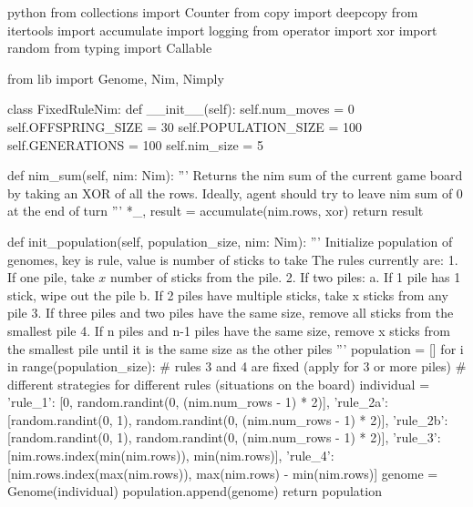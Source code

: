 \begin{mintedbox}{python}
    from collections import Counter
    from copy import deepcopy
    from itertools import accumulate
    import logging
    from operator import xor
    import random
    from typing import Callable

    from lib import Genome, Nim, Nimply


    class FixedRuleNim:
        def __init__(self):
            self.num_moves = 0
            self.OFFSPRING_SIZE = 30
            self.POPULATION_SIZE = 100
            self.GENERATIONS = 100
            self.nim_size = 5

        def nim_sum(self, nim: Nim):
            '''
            Returns the nim sum of the current game board
            by taking an XOR of all the rows.
            Ideally, agent should try to leave nim sum of 0 at the end of turn
            '''
            *_, result = accumulate(nim.rows, xor)
            return result

        def init_population(self, population_size, nim: Nim):
            '''
            Initialize population of genomes,
            key is rule, value is number of sticks to take
            The rules currently are:
            1. If one pile, take $x$ number of sticks from the pile.
            2. If two piles:
                a. If 1 pile has 1 stick, wipe out the pile
                b. If 2 piles have multiple sticks, take x sticks from any pile
            3. If three piles and two piles have the same size, remove all sticks from the smallest pile
            4. If n piles and n-1 piles have the same size, remove x sticks from the smallest pile until it is the same size as the other piles
            '''
            population = []
            for i in range(population_size):
                # rules 3 and 4 are fixed (apply for 3 or more piles)
                # different strategies for different rules (situations on the board)
                individual = {
                    'rule_1': [0, random.randint(0, (nim.num_rows - 1) * 2)],
                    'rule_2a': [random.randint(0, 1), random.randint(0, (nim.num_rows - 1) * 2)],
                    'rule_2b': [random.randint(0, 1), random.randint(0, (nim.num_rows - 1) * 2)],
                    'rule_3': [nim.rows.index(min(nim.rows)), min(nim.rows)],
                    'rule_4': [nim.rows.index(max(nim.rows)), max(nim.rows) - min(nim.rows)]
                }
                genome = Genome(individual)
                population.append(genome)
            return population


\end{mintedbox}
